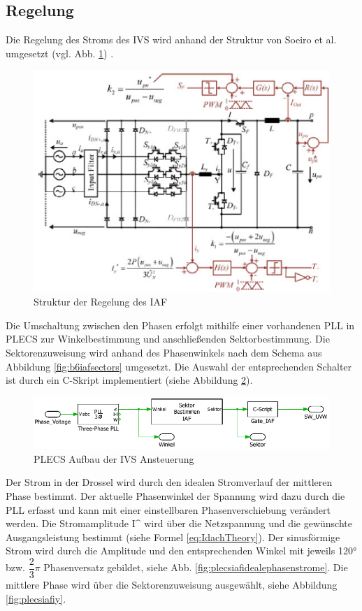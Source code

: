 	\subsection{Regelung}
		Die Regelung des Stroms des IVS wird anhand der Struktur von Soeiro et al. umgesetzt (vgl. Abb. \ref{fig:iafpapercontrol}) \cite{Soeiro.2013}.
		 \begin{figure}[H]
			\centering
			\includegraphics[width=0.8\linewidth]{content/Grafiken/IAF_Paper_Control}
			\caption{Struktur der Regelung des IAF \cite{Soeiro.2013}}
			\label{fig:iafpapercontrol}
		\end{figure}
		Die Umschaltung zwischen den Phasen erfolgt mithilfe einer vorhandenen PLL in PLECS zur Winkelbestimmung und anschließenden Sektorbestimmung. Die Sektorenzuweisung wird anhand des Phasenwinkels nach dem Schema aus Abbildung \ref{fig:b6iafsectors} umgesetzt. Die Auswahl der entsprechenden Schalter ist durch ein C-Skript implementiert (siehe Abbildung \ref{fig:plecsiafivscontrol}). 
		\begin{figure}[H]
			\centering
			\includegraphics[width=1\linewidth]{content/Grafiken/PlecsIAFivscontrol}
			\caption{PLECS Aufbau der \gls{IVS} Ansteuerung}
			\label{fig:plecsiafivscontrol}
		\end{figure}
			Der Strom in der Drossel wird durch den idealen Stromverlauf der mittleren Phase bestimmt. Der aktuelle Phasenwinkel der Spannung wird dazu durch die PLL erfasst und kann mit einer einstellbaren Phasenverschiebung verändert werden. Die Stromamplitude \gls{I^} wird über die Netzspannung und die gewünschte Ausgangsleistung bestimmt (siehe Formel \ref{eq:IdachTheory}). Der sinusförmige Strom wird durch die Amplitude und den entsprechenden Winkel mit jeweils 120° bzw. $\dfrac{2}{3}\pi$ Phasenversatz gebildet, siehe Abb. \ref{fig:plecsiafidealephasenstrome}. Die mittlere Phase wird über die Sektorenzuweisung ausgewählt, siehe Abbildung \ref{fig:plecsiafiy}.
